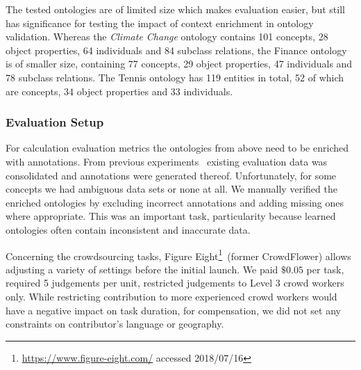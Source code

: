 \documentclass[draft,final]{vutinfth} %
\begin{document}
The tested ontologies are of limited size which makes evaluation easier, but still has significance for testing the impact of context enrichment in ontology validation. Whereas the \emph{Climate Change} ontology contains 101 concepts, 28 object properties, 64 individuals and 84 subclass relations, the Finance ontology is of smaller size, containing 77 concepts, 29 object properties, 47 individuals and 78 subclass relations. The Tennis ontology has 119 entities in total, 52 of which are concepts, 34 object properties and 33 individuals. 

\subsubsection{Evaluation Setup}
For calculation evaluation metrics the ontologies from above need to be enriched with annotations. From previous experiments~\cite{wohlgenannt2016} existing evaluation data was consolidated and annotations were generated thereof. Unfortunately, for some concepts we had ambiguous data sets or none at all. We manually verified the enriched ontologies by excluding incorrect annotations and adding missing ones where appropriate. This was an important task, particularity because learned ontologies often contain inconsistent and inaccurate data. 

Concerning the crowdsourcing tasks, Figure Eight\footnote{\url{https://www.figure-eight.com/} accessed 2018/07/16}~(former CrowdFlower) allows adjusting a variety of settings before the initial launch. We paid $\$0.05$ per task, required 5 judgements per unit, restricted judgements to Level 3 crowd workers only. While restricting contribution to more experienced crowd workers would have a negative impact on task duration, for compensation, we did not set any constraints on contributor's language or geography. 








%
\end{document}

